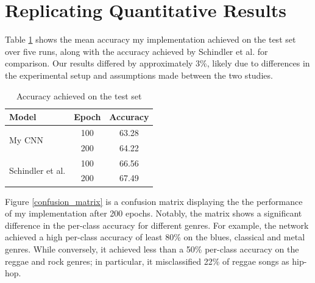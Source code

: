 \documentclass[conference]{IEEEtran}
\begin{document}
\section{Replicating Quantitative Results}

Table \ref{shallow_results} shows the mean accuracy my implementation achieved on the test set over five runs, along with the accuracy achieved by Schindler et al. \cite{SchindlerLidyRauber} for comparison.
Our results differed by approximately 3\%, likely due to differences in the experimental setup and assumptions made between the two studies.

\begin{table}[htbp]
    \caption{Accuracy achieved on the test set}
    \begin{center}
    \begin{tabular}{l c c}
    \toprule
    \textbf{Model}&\textbf{Epoch}&\textbf{Accuracy}\\
    \midrule
    \multirow{ 2}{*}{My CNN} & 100 & 63.28 \\
    & 200 & 64.22 \\
    \midrule
    \multirow{ 2}{*}{Schindler et al.} & 100 & 66.56\\
    & 200 & 67.49 \\
    \bottomrule
    \end{tabular}
    \label{shallow_results}
    \end{center}
\end{table}

Figure \ref{confusion_matrix} is a confusion matrix displaying the the performance of my implementation after 200 epochs.
Notably, the matrix shows a significant difference in the per-class accuracy for different genres.
For example, the network achieved a high per-class accuracy of least 80\% on the blues, classical and metal genres.
While conversely, it achieved less than a 50\% per-class accuracy on the reggae and rock genres; in particular, it misclassified 22\% of reggae songs as hip-hop.
\end{document}
